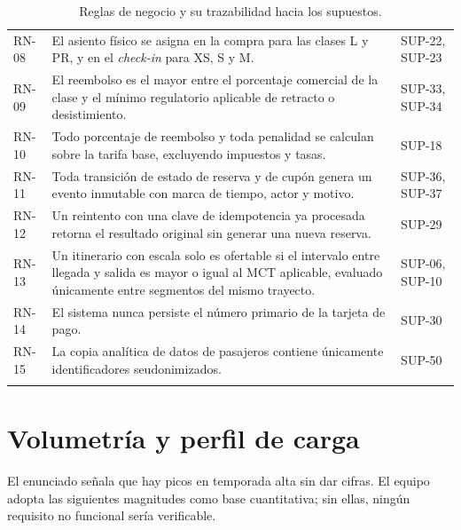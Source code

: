 \documentclass[10pt,letterpaper]{article}
\begin{document}
\begin{longtable}{@{}L{1.6cm} L{11.2cm} L{2.4cm}@{}}
RN-08 & El asiento físico se asigna en la compra para las clases L y PR, y en el \emph{check-in} para XS, S y M. & SUP-22, SUP-23 \\
RN-09 & El reembolso es el mayor entre el porcentaje comercial de la clase y el mínimo regulatorio aplicable de retracto o desistimiento. & SUP-33, SUP-34 \\
RN-10 & Todo porcentaje de reembolso y toda penalidad se calculan sobre la tarifa base, excluyendo impuestos y tasas. & SUP-18 \\
RN-11 & Toda transición de estado de reserva y de cupón genera un evento inmutable con marca de tiempo, actor y motivo. & SUP-36, SUP-37 \\
RN-12 & Un reintento con una clave de idempotencia ya procesada retorna el resultado original sin generar una nueva reserva. & SUP-29 \\
RN-13 & Un itinerario con escala solo es ofertable si el intervalo entre llegada y salida es mayor o igual al MCT aplicable, evaluado únicamente entre segmentos del mismo trayecto. & SUP-06, SUP-10 \\
RN-14 & El sistema nunca persiste el número primario de la tarjeta de pago. & SUP-30 \\
RN-15 & La copia analítica de datos de pasajeros contiene únicamente identificadores seudonimizados. & SUP-50 \\
\bottomrule
\caption{Reglas de negocio y su trazabilidad hacia los supuestos.}
\end{longtable}

\section{Volumetría y perfil de carga}
\label{sec:volumetria}
El enunciado señala que hay picos en temporada alta sin dar cifras. El equipo adopta las siguientes magnitudes como base cuantitativa; sin ellas, ningún requisito no funcional sería verificable.
\end{document}
